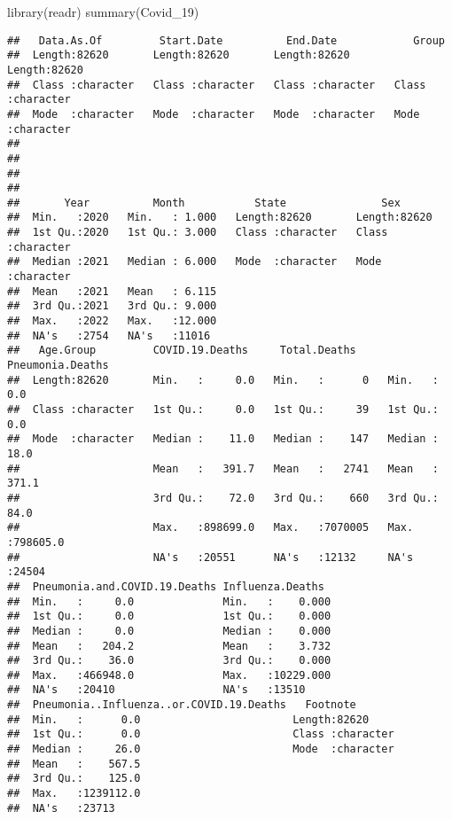 \documentclass[
]{article}
\newenvironment{Shaded}{\begin{snugshade}}{\end{snugshade}}
\newcommand{\FunctionTok}[1]{\textcolor[rgb]{0.00,0.00,0.00}{#1}}
\newcommand{\NormalTok}[1]{#1}
\begin{document}
\begin{Shaded}
\begin{Highlighting}[]
\FunctionTok{library}\NormalTok{(readr)}
\FunctionTok{summary}\NormalTok{(Covid\_19)}
\end{Highlighting}
\end{Shaded}

\begin{verbatim}
##   Data.As.Of         Start.Date          End.Date            Group          
##  Length:82620       Length:82620       Length:82620       Length:82620      
##  Class :character   Class :character   Class :character   Class :character  
##  Mode  :character   Mode  :character   Mode  :character   Mode  :character  
##                                                                             
##                                                                             
##                                                                             
##                                                                             
##       Year          Month           State               Sex           
##  Min.   :2020   Min.   : 1.000   Length:82620       Length:82620      
##  1st Qu.:2020   1st Qu.: 3.000   Class :character   Class :character  
##  Median :2021   Median : 6.000   Mode  :character   Mode  :character  
##  Mean   :2021   Mean   : 6.115                                        
##  3rd Qu.:2021   3rd Qu.: 9.000                                        
##  Max.   :2022   Max.   :12.000                                        
##  NA's   :2754   NA's   :11016                                         
##   Age.Group         COVID.19.Deaths     Total.Deaths     Pneumonia.Deaths  
##  Length:82620       Min.   :     0.0   Min.   :      0   Min.   :     0.0  
##  Class :character   1st Qu.:     0.0   1st Qu.:     39   1st Qu.:     0.0  
##  Mode  :character   Median :    11.0   Median :    147   Median :    18.0  
##                     Mean   :   391.7   Mean   :   2741   Mean   :   371.1  
##                     3rd Qu.:    72.0   3rd Qu.:    660   3rd Qu.:    84.0  
##                     Max.   :898699.0   Max.   :7070005   Max.   :798605.0  
##                     NA's   :20551      NA's   :12132     NA's   :24504     
##  Pneumonia.and.COVID.19.Deaths Influenza.Deaths   
##  Min.   :     0.0              Min.   :    0.000  
##  1st Qu.:     0.0              1st Qu.:    0.000  
##  Median :     0.0              Median :    0.000  
##  Mean   :   204.2              Mean   :    3.732  
##  3rd Qu.:    36.0              3rd Qu.:    0.000  
##  Max.   :466948.0              Max.   :10229.000  
##  NA's   :20410                 NA's   :13510      
##  Pneumonia..Influenza..or.COVID.19.Deaths   Footnote        
##  Min.   :      0.0                        Length:82620      
##  1st Qu.:      0.0                        Class :character  
##  Median :     26.0                        Mode  :character  
##  Mean   :    567.5                                          
##  3rd Qu.:    125.0                                          
##  Max.   :1239112.0                                          
##  NA's   :23713
\end{verbatim}
\end{document}
